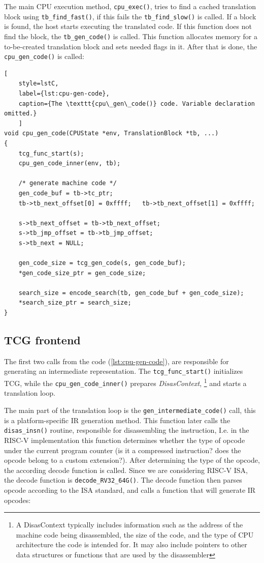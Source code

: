The main CPU execution method, \texttt{cpu\_exec()}, tries to find a cached translation block using
\texttt{tb\_find\_fast()}, if this fails the \texttt{tb\_find\_slow()} is called. If a block is found, the host starts
executing the translated code. If this function does not find the block, the \texttt{tb\_gen\_code()} is called.
This function allocates memory for a to-be-created translation block and sets needed flags in it. After that is done,
the \texttt{cpu\_gen\_code()} is called:

\nopagebreak[4]
\begin{lstlisting}[
    style=lstC,
    label={lst:cpu-gen-code},
    caption={The \texttt{cpu\_gen\_code()} code. Variable declaration omitted.}
    ]
void cpu_gen_code(CPUState *env, TranslationBlock *tb, ...)
{
    tcg_func_start(s);
    cpu_gen_code_inner(env, tb);

    /* generate machine code */
    gen_code_buf = tb->tc_ptr;
    tb->tb_next_offset[0] = 0xffff;   tb->tb_next_offset[1] = 0xffff;

    s->tb_next_offset = tb->tb_next_offset;
    s->tb_jmp_offset = tb->tb_jmp_offset;
    s->tb_next = NULL;

    gen_code_size = tcg_gen_code(s, gen_code_buf);
    *gen_code_size_ptr = gen_code_size;

    search_size = encode_search(tb, gen_code_buf + gen_code_size);
    *search_size_ptr = search_size;
}
\end{lstlisting}

\subsection{TCG frontend}

The first two calls from the code (\ref{lst:cpu-gen-code}), are responsible for generating an intermediate
representation. The \texttt{tcg\_func\_start()} initializes TCG, while the \texttt{cpu\_gen\_code\_inner()} prepares
\textit{DisasContext},%
\footnote{A DisasContext typically includes information such as the address of the machine code being disassembled,
the size of the code, and the type of CPU architecture the code is intended for. It may also include pointers to other
data structures or functions that are used by the disassembler}
and starts a translation loop.

The main part of the translation loop is the \texttt{gen\_intermediate\_code()} call, this is a platform-specific
IR generation method. This function later calls the \texttt{disas\_insn()} routine, responsible for disassembling
the instruction, I.e. in the RISC-V implementation this function determines whether the type of opcode under the current
program counter (is it a compressed instruction? does the opcode belong to a custom extension?). After determining
the type of the opcode, the according decode function is called. Since we are considering RISC-V ISA, the decode function
is \texttt{decode\_RV32\_64G()}. The decode function then parses opcode according to the ISA standard, and calls a
function that will generate IR opcodes:


